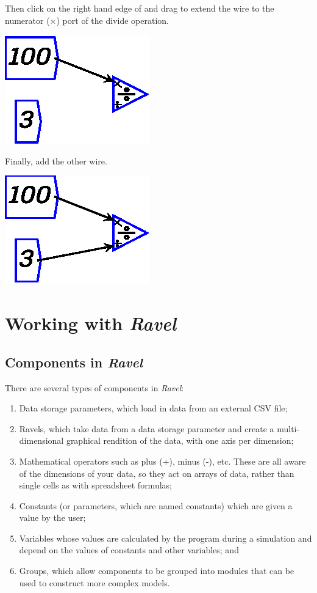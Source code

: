 Then click on the right hand edge of  and
drag to extend the wire to the numerator ($\times$) port of the divide
operation.
\begin{center}
\includegraphics{images/wireExample1} 
\par\end{center}

Finally, add the other wire. 
\begin{center}
\includegraphics{images/wireExample2} 
\par\end{center}

\section{Working with \emph{Ravel}}

\subsection{Components in \emph{Ravel}}

There are several types of components in \emph{Ravel}: 
\begin{enumerate}
\item Data storage parameters, which load in data from an external CSV file; 
\item Ravels, which take data from a data storage parameter and create a
multi-dimensional graphical rendition of the data, with one axis per
dimension; 
\item Mathematical operators such as plus (+), minus (-), etc. These are
all aware of the dimensions of your data, so they act on arrays of
data, rather than single cells as with spreadsheet formulas; 
\item Constants (or parameters, which are named constants) which are given
a value by the user; 
\item Variables whose values are calculated by the program during a simulation
and depend on the values of constants and other variables; and 
\item Groups, which allow components to be grouped into modules that can
be used to construct more complex models. 
\end{enumerate}

